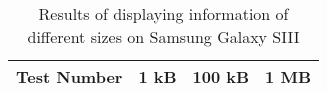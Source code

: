 	\begin{table}[ht!]
    		\caption{Results of displaying information of different sizes on Samsung Galaxy SIII} \label{tab:distamceGoogleGlassFull}
		\centering \begin{tabularx}{\textwidth}{l|X|X|X} \hline
		Test Number & \textbf{1 kB} & \textbf{100 kB} & \textbf{1 MB} \\ \hline \hline
%		
		

\end{tabularx}
\end{table}
